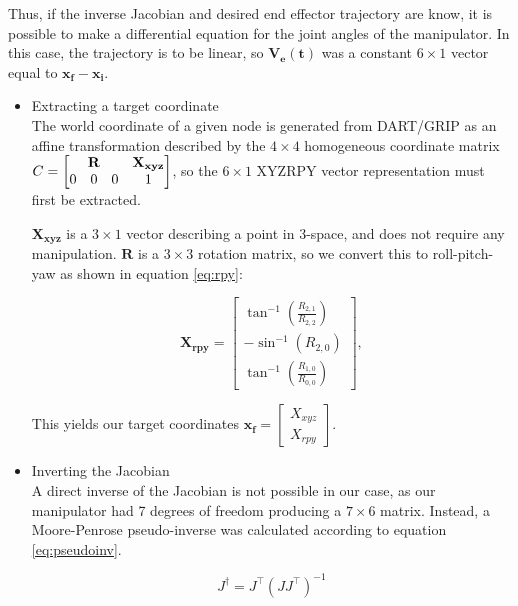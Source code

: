 \documentclass[10pt, conference]{IEEEtran}
\begin{document}
    Thus, if the inverse Jacobian and desired end effector trajectory
    are know, it is possible to make a differential equation for the
    joint angles of the manipulator. In this case, the trajectory is to
    be linear, so \(\mathbf{V_e(t)}\) was a constant \(6 \times 1\) vector equal
    to \(\mathbf{x_f}-\mathbf{x_i}\).
\begin{itemize}

\item Extracting a target coordinate\\
\label{sec-3-3-1-1}%
The world coordinate of a given node is generated from DART/GRIP as
     an affine transformation described by the \(4 \times 4\)
     homogeneous coordinate matrix \(C = \begin{bmatrix}
     \multicolumn{3}{c}{\mathbf{R}} & \mathbf{X_{xyz}} \\ 0 & 0 & 0 & 1 \end{bmatrix}\),
     so the \(6 \times 1\) XYZRPY vector representation must first be
     extracted.

     \(\mathbf{X_{xyz}}\) is a \(3 \times 1\) vector describing a point in
     3-space, and does not require any manipulation. \(\mathbf{R}\) is a \(3
     \times 3\) rotation matrix, so we convert this to roll-pitch-yaw as
     shown in equation \ref{eq:rpy}:

     \begin{equation}
     \label{eq:rpy}
     \mathbf{X_{rpy}} = \begin{bmatrix} \tan^{-1}(\frac{R_{2,1}}{R_{2,2}}) \\
     -\sin^{-1}(R_{2,0}) \\ \tan^{-1}(\frac{R_{1,0}}{R_{0,0}}) \end{bmatrix},
     \end{equation}

     This yields our target coordinates \(\mathbf{x_{f}}
     = \begin{bmatrix}X_{xyz} \\ X_{rpy} \end{bmatrix} \).


\item Inverting the Jacobian\\
\label{sec-3-3-1-2}%
A direct inverse of the Jacobian is not possible in our case, as
     our manipulator had 7 degrees of freedom producing a \(7 \times 6\)
     matrix. Instead, a Moore-Penrose pseudo-inverse was calculated
     according to equation \ref{eq:pseudoinv}.

     \begin{equation}
     \label{eq:pseudoinv}
     J^{\dagger} = J^{\top}(JJ^{\top})^{-1}
     \end{equation}


\end{itemize}
\end{document}
